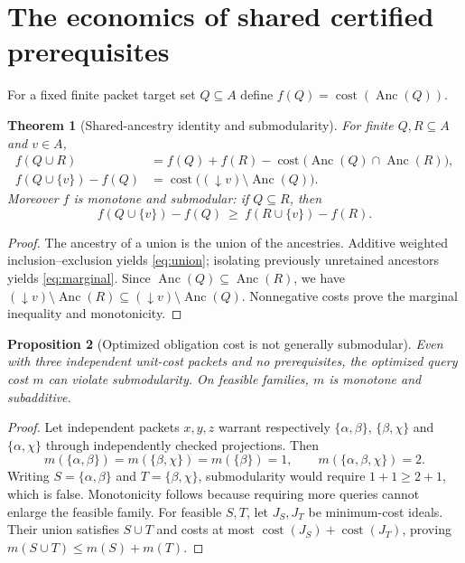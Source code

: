 \documentclass[10pt,letterpaper]{article}
\newtheorem{theorem}{Theorem}[section]
\newtheorem{proposition}[theorem]{Proposition}
\theoremstyle{definition}
\theoremstyle{remark}
\newcommand{\Anc}{\operatorname{Anc}}
\newcommand{\cost}{\operatorname{cost}}
\begin{document}
\section{The economics of shared certified prerequisites}\label{gl-first-W2-s6}
For a fixed finite packet target set $Q\subseteq A$ define $f(Q)=\cost(\Anc(Q))$.
\begin{theorem}[Shared-ancestry identity and submodularity]\label{thm:submod}
For finite $Q,R\subseteq A$ and $v\in A$,
\begin{align}
f(Q\cup R)&=f(Q)+f(R)-\cost\bigl(\Anc(Q)\cap\Anc(R)\bigr),\label{eq:union}\\
f(Q\cup\{v\})-f(Q)&=\cost\bigl((\downarrow v)\setminus\Anc(Q)\bigr).\label{eq:marginal}
\end{align}
Moreover $f$ is monotone and submodular: if $Q\subseteq R$, then
\[
f(Q\cup\{v\})-f(Q)\ \ge\ f(R\cup\{v\})-f(R).
\]
\end{theorem}
\begin{proof}
The ancestry of a union is the union of the ancestries. Additive weighted inclusion--exclusion yields \eqref{eq:union}; isolating previously unretained ancestors yields \eqref{eq:marginal}. Since $\Anc(Q)\subseteq\Anc(R)$, we have $(\downarrow v)\setminus\Anc(R)\subseteq(\downarrow v)\setminus\Anc(Q)$. Nonnegative costs prove the marginal inequality and monotonicity.\end{proof}

\begin{proposition}[Optimized obligation cost is not generally submodular]\label{prop:nonsub}
Even with three independent unit-cost packets and no prerequisites, the optimized query cost $m$ can violate submodularity. On feasible families, $m$ is monotone and subadditive.
\end{proposition}
\begin{proof}
Let independent packets $x,y,z$ warrant respectively $\{\alpha,\beta\}$, $\{\beta,\chi\}$ and $\{\alpha,\chi\}$ through independently checked projections. Then
\[
m(\{\alpha,\beta\})=m(\{\beta,\chi\})=m(\{\beta\})=1,
\qquad m(\{\alpha,\beta,\chi\})=2.
\]
Writing $S=\{\alpha,\beta\}$ and $T=\{\beta,\chi\}$, submodularity would require $1+1\ge2+1$, which is false. Monotonicity follows because requiring more queries cannot enlarge the feasible family. For feasible $S,T$, let $J_S,J_T$ be minimum-cost ideals. Their union satisfies $S\cup T$ and costs at most $\cost(J_S)+\cost(J_T)$, proving $m(S\cup T)\le m(S)+m(T)$.\end{proof}
\end{document}
